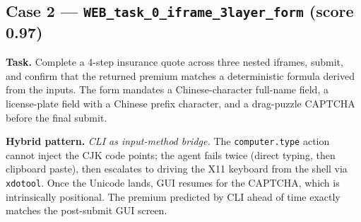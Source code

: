 \documentclass{llmxive}
\begin{document}
\subsection{Case 2 --- \texttt{WEB\_task\_0\_iframe\_3layer\_form} (score 0.97)}
\label{app:case-iframe}

\textbf{Task.} Complete a 4-step insurance quote across three nested iframes, submit, and confirm that the returned premium matches a deterministic formula derived from the inputs. The form mandates a Chinese-character full-name field, a license-plate field with a Chinese prefix character, and a drag-puzzle CAPTCHA before the final submit.

\textbf{Hybrid pattern.} \emph{CLI as input-method bridge.} The \texttt{computer.type} action cannot inject the CJK code points; the agent fails twice (direct typing, then clipboard paste), then escalates to driving the X11 keyboard from the shell via \texttt{xdotool}. Once the Unicode lands, GUI resumes for the CAPTCHA, which is intrinsically positional. The premium predicted by CLI ahead of time exactly matches the post-submit GUI screen.
\end{document}
